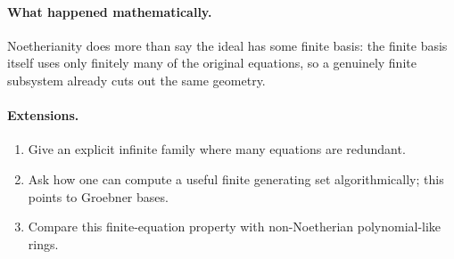 \paragraph{What happened mathematically.}
Noetherianity does more than say the ideal has some finite basis: the finite basis itself
uses only finitely many of the original equations, so a genuinely finite subsystem already
cuts out the same geometry.

\paragraph{Extensions.}
\begin{enumerate}
\item Give an explicit infinite family where many equations are redundant.
\item Ask how one can compute a useful finite generating set algorithmically; this points to
      Groebner bases.
\item Compare this finite-equation property with non-Noetherian polynomial-like rings.
\end{enumerate}
\fi
